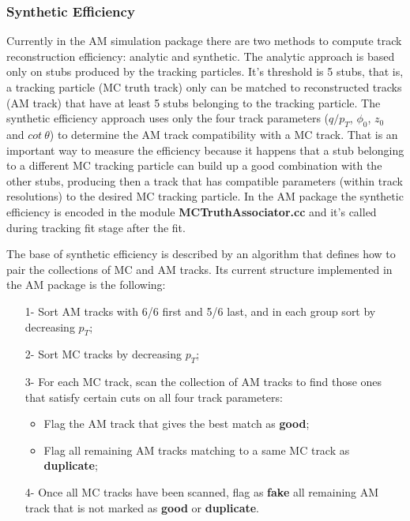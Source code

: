 \subsubsection{Synthetic Efficiency}
Currently in the AM simulation package there are two methods to compute track reconstruction efficiency: analytic and synthetic. The analytic approach is based only on stubs produced by the tracking particles. It's threshold is 5 stubs, that is, a tracking particle (MC truth track) only can be matched to reconstructed tracks (AM track) that have at least 5 stubs belonging to the tracking particle. The synthetic efficiency approach uses only the four track parameters ($q/p_{T}$, $\phi_0$, $z_{0}$ and $cot~\theta$) to determine the AM track compatibility with a MC track. That is an important way to measure the efficiency because it happens that a stub belonging to a different MC tracking particle can build up a good combination with the other stubs, producing then a track that has compatible parameters (within track resolutions) to the desired MC tracking particle. In the AM package the synthetic efficiency is encoded in the module \textbf{MCTruthAssociator.cc} and it's called during tracking fit stage after the fit. 

The base of synthetic efficiency is described by an algorithm that defines how to pair the collections of MC and AM tracks. Its current structure implemented in the AM package is the following:

\begin{itemize}
	\item [1-] Sort AM tracks with 6/6 first and 5/6 last, and in each group sort by decreasing $p_{T}$;
	\item [2-] Sort MC tracks by decreasing $p_{T}$;
	\item [3-] For each MC track, scan the collection of AM tracks to find those ones that satisfy certain cuts on all four track parameters:
	\begin{itemize}
		\item Flag the AM track that gives the best match as \textbf{good};
		\item Flag all remaining AM tracks matching to a same MC track as \textbf{duplicate};
	\end{itemize}
	\item [4-] Once all MC tracks have been scanned, flag as \textbf{fake} all remaining AM track that is not marked as \textbf{good} or \textbf{duplicate}.
\end{itemize}


